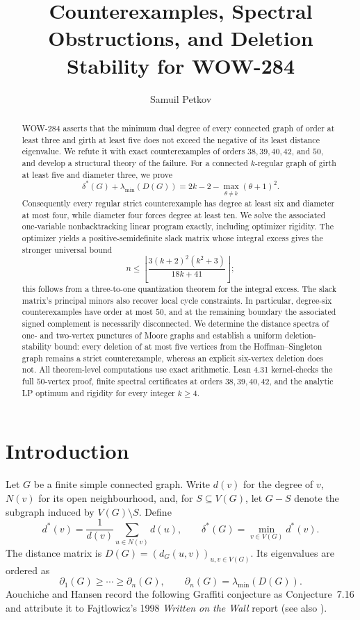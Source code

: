 \documentclass[a4paper,10pt,reqno]{amsart}
\title[Counterexamples and obstructions for WOW-284]
{Counterexamples, Spectral Obstructions, and Deletion Stability for WOW-284}
\author{Samuil Petkov}
\date{}
\theoremstyle{plain}
\theoremstyle{definition}
\theoremstyle{remark}
\begin{document}
\begin{abstract}
WOW-284 asserts that the minimum dual degree of every connected graph of
order at least three and girth at least five does not exceed the negative of
its least distance eigenvalue.  We refute it with exact counterexamples of
orders \(38,39,40,42\), and \(50\), and develop a structural theory of the
failure.  For a connected \(k\)-regular graph of girth at least five and
diameter three, we prove
\[
 \delta^*(G)+\lambda_{\min}(D(G))
 =2k-2-\max_{\theta\ne k}(\theta+1)^2.
\]
Consequently every regular strict counterexample has degree at least six and
diameter at most four, while diameter four forces degree at least ten.  We
solve the associated one-variable nonbacktracking linear program exactly,
including optimizer rigidity.  The optimizer yields a positive-semidefinite
slack matrix whose integral excess gives the stronger universal bound
\[
 n\le\left\lfloor
 \frac{3(k+2)^2(k^2+3)}{18k+41}
 \right\rfloor;
\]
this follows from a three-to-one quantization theorem for the integral excess.
The slack matrix's principal minors also recover local cycle constraints.  In
particular, degree-six counterexamples have order at most \(50\), and at the
remaining boundary the associated signed complement is necessarily
disconnected.  We determine the distance spectra of one- and two-vertex
punctures of Moore graphs and establish a uniform deletion-stability bound:
every deletion of at most five vertices from the Hoffman--Singleton graph
remains a strict counterexample, whereas an explicit six-vertex deletion does
not.  All
theorem-level computations use exact arithmetic.  Lean 4.31 kernel-checks the
full \(50\)-vertex proof,
finite spectral certificates at orders \(38,39,40,42\), and the analytic LP
optimum and rigidity for every integer \(k\ge4\).
\end{abstract}

\maketitle

\section{Introduction}\label{sec:introduction}

Let \(G\) be a finite simple connected graph.  Write \(d(v)\) for the degree
of \(v\), \(N(v)\) for its open neighbourhood, and, for
\(S\subseteq V(G)\), let \(G-S\) denote the subgraph induced by
\(V(G)\setminus S\).  Define
\[
 d^*(v)=\frac1{d(v)}\sum_{u\in N(v)}d(u),
 \qquad
 \delta^*(G)=\min_{v\in V(G)}d^*(v).
\]
The distance matrix is \(D(G)=(d_G(u,v))_{u,v\in V(G)}\).  Its eigenvalues are
ordered as
\[
 \partial_1(G)\ge\cdots\ge\partial_n(G),
 \qquad \partial_n(G)=\lambda_{\min}(D(G)).
\]
Aouchiche and Hansen record the following Graffiti conjecture as
Conjecture~7.16 and attribute it to Fajtlowicz's 1998
\emph{Written on the Wall} report
\cite{Fajtlowicz1998} (see also \cite[Conjecture~7.16]{AouchicheHansen2014}).
\end{document}
